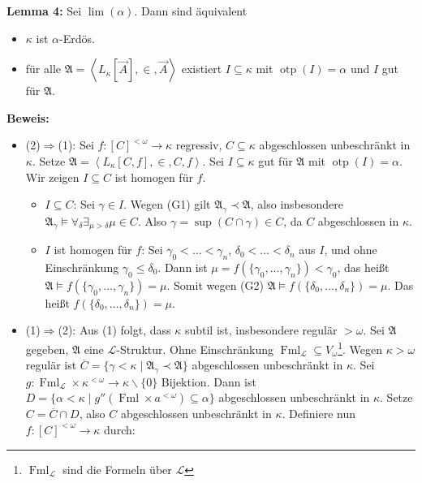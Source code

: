 \documentclass[a4paper,fontsize=11pt]{scrartcl}
\newcommand{\Fml}{\operatorname{Fml}}
\newcommand{\otp}{\operatorname{otp}}
\begin{document}
{\bf Lemma 4:} Sei $\lim(\alpha)$. Dann sind äquivalent
\begin{itemize}
  \item[(1)] $\kappa$ ist $\alpha$-Erdös.
  \item[(2)] für alle $\mathfrak{A}=\left< L_\kappa[\vec{A}], \in,
    \vec{A} \right>$ existiert $I\subseteq\kappa$ mit $\otp(I) =
    \alpha$ und $I$ gut für $\mathfrak{A}$.
\end{itemize}
{\bf Beweis:}
\begin{itemize}
  \item (2)$\Rightarrow$(1): Sei $f:[C]^{<\omega}\rightarrow\kappa$
    regressiv, $C\subseteq\kappa$ abgeschlossen unbeschränkt in
    $\kappa$. Setze $\mathfrak{A} = \left<L_\kappa[C,f], \in, C,
    f\right>$. Sei $I \subseteq \kappa$ gut für $\mathfrak{A}$ mit
    $\otp(I) = \alpha$. Wir zeigen $I \subseteq C$ ist homogen für $f$.
    \begin{itemize}
      \item[(a)] $I \subseteq C$: \newline Sei $\gamma\in I$. Wegen
        (G1) gilt $\mathfrak{A}_\gamma \prec \mathfrak{A}$, also
        insbesondere $\mathfrak{A}_\gamma \models \forall_\delta
        \exists_{\mu>\delta} \mu\in C$. Also $\gamma = \sup(C \cap
        \gamma) \in C$, da $C$ abgeschlossen in $\kappa$.
      \item[(b)] $I$ ist homogen für $f$: \newline Sei $\gamma_0 <
        \ldots < \gamma_n$, $\delta_0 < \ldots < \delta_n$ aus $I$,
        und ohne Einschränkung $\gamma_0 \le \delta_0$. Dann ist $\mu
        = f(\{\gamma_0, \ldots, \gamma_n\}) < \gamma_0$, das heißt
        $\mathfrak{A} \models f(\{\gamma_0, \ldots, \gamma_n\}) =
        \mu$. Somit wegen (G2) $\mathfrak{A} \models f(\{\delta_0,
        \ldots, \delta_n\}) = \mu$. Das heißt $f(\{\delta_0, \ldots,
        \delta_n\}) = \mu$.
    \end{itemize}
  \item (1)$\Rightarrow$(2): Aus (1) folgt, dass $\kappa$ subtil ist,
    insbesondere regulär $>\omega$. Sei $\mathfrak{A}$ gegeben,
    $\mathfrak{A}$ eine $\mathcal{L}$-Struktur. Ohne Einschränkung
    $\Fml_{\mathcal{L}}\subseteq
    V_\omega$\footnote{$\Fml_{\mathcal{L}}$ sind die Formeln über
      $\mathcal{L}$}. Wegen $\kappa>\omega$ regulär ist
    $\overline{C}=\{\gamma<\kappa\mid\mathfrak{A}_\gamma\prec\mathfrak{A}\}$
    abgeschlossen unbeschränkt in $\kappa$. Sei $g:\Fml_{\mathcal{L}}
    \times \kappa^{<\omega} \rightarrow \kappa\backslash\{0\}$
    Bijektion. Dann ist $D = \{\alpha < \kappa \mid g''(\Fml \times
    a^{<\omega})\subseteq \alpha\}$ abgeschlossen unbeschränkt in
    $\kappa$. Setze $C = \overline{C} \cap D$, also $C$ abgeschlossen
    unbeschränkt in $\kappa$. Definiere nun
    $f:[C]^{<\omega}\rightarrow\kappa$ durch:


\end{itemize}
\end{document}
